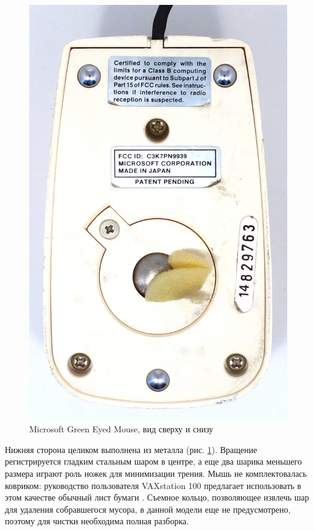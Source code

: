 \documentclass[11pt, a4paper]{article}
\begin{document}
\begin{figure}[h]
    \includegraphics[scale=0.5]{1983_microsoft_green_eyed_mouse/bottom_60.jpg}
    \caption{Microsoft Green Eyed Mouse, вид сверху и снизу}
    \label{fig:MicrosoftGreenEyedTopAndBottom}
\end{figure}

Нижняя сторона целиком выполнена из металла (рис. \ref{fig:MicrosoftGreenEyedTopAndBottom}). Вращение регистрируется гладким стальным шаром в центре, а еще два шарика меньшего размера играют роль ножек для минимизации трения. Мышь не комплектовалась ковриком: руководство пользователя VAXstation 100 предлагает использовать в этом качестве обычный лист бумаги \cite{manual}.
 Съемное кольцо, позволяющее извлечь шар для удаления собравшегося мусора, в данной модели еще не предусмотрено, поэтому для чистки необходима полная разборка.
\end{document}
